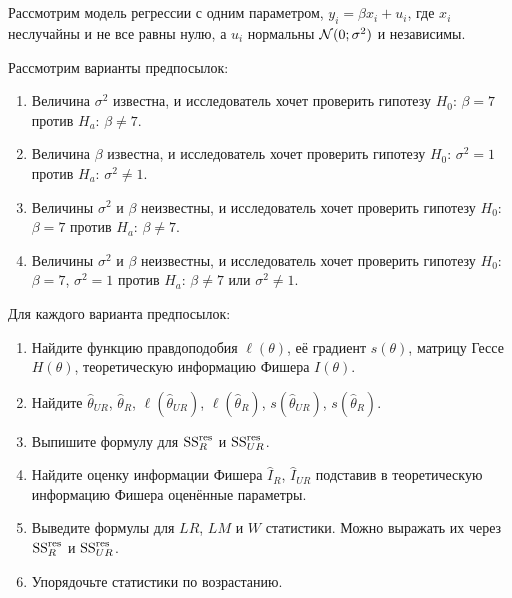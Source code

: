\section{}

\begin{problem}
Рассмотрим модель регрессии с одним параметром, $y_i = \beta x_i + u_i$,
где $x_i$ неслучайны и не все равны нулю, а $u_i$ нормальны $\mathcal{N}(0;\sigma^2)$ и независимы.

Рассмотрим варианты предпосылок:

\begin{enumerate}
    \item Величина $\sigma^2$ известна,
    и исследователь хочет проверить гипотезу $H_0$: $\beta = 7$ против $H_a$: $\beta \neq 7$.
    \item Величина $\beta$ известна,
    и исследователь хочет проверить гипотезу $H_0$: $\sigma^2 = 1$ против $H_a$: $\sigma^2 \neq 1$.
    \item Величины $\sigma^2$ и $\beta$ неизвестны,
    и исследователь хочет проверить гипотезу $H_0$: $\beta = 7$ против $H_a$: $\beta \neq 7$.
    \item Величины $\sigma^2$ и $\beta$ неизвестны,
    и исследователь хочет проверить гипотезу $H_0$: $\beta = 7$, $\sigma^2 = 1$ против $H_a$: $\beta \neq 7$ или $\sigma^2 \neq 1$.
\end{enumerate}

Для каждого варианта предпосылок:

\begin{enumerate}
    \item Найдите функцию правдоподобия $\ell(\theta)$, её градиент $s(\theta)$,
    матрицу Гессе $H(\theta)$, теоретическую информацию Фишера $I(\theta)$.
    \item Найдите $\hat\theta_{UR}$, $\hat\theta_R$, $\ell(\hat\theta_{UR})$,
    $\ell(\hat\theta_R)$, $s(\hat\theta_{UR})$, $s(\hat\theta_R)$.
    \item Выпишите формулу для $\mathrm{SS}^{\text{res}}_R$ и $\mathrm{SS}^{\text{res}}_{UR}$.
    \item Найдите оценку информации Фишера $\hat I_R$, $\hat I_{UR}$
    подставив в теоретическую информацию Фишера оценённые параметры.
    \item Выведите формулы для $LR$, $LM$ и $W$ статистики.
    Можно выражать их через $\mathrm{SS}^{\text{res}}_R$ и $\mathrm{SS}^{\text{res}}_{UR}$.
    \item Упорядочьте статистики по возрастанию.
\end{enumerate}


\begin{sol}

\end{sol}
\end{problem}




